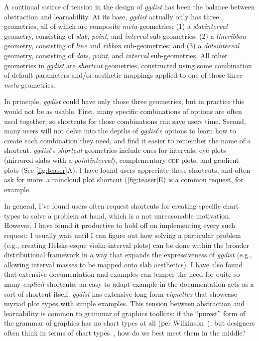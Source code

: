 \documentclass[journal]{vgtc}              %
\begin{document}
A continual source of tension in the design of \textit{ggdist} has been the balance between abstraction and learnability. At its base, \textit{ggdist} actually only has three geometries, all of which are composite \textit{meta}-geometries: (1) a \textit{slabinterval} geometry, consisting of \textit{slab}, \textit{point}, and \textit{interval} sub-geometries; (2) a \textit{lineribbon} geometry, consisting of \textit{line} and \textit{ribbon} sub-geometries; and (3) a \textit{dotsinterval} geometry, consisting of \textit{dots}, \textit{point}, and \textit{interval} sub-geometries. All other geometries in \textit{ggdist} are \textit{shortcut} geometries, constructed using some combination of default parameters and/or aesthetic mappings applied to one of those three \textit{meta}-geometries.

In principle, \textit{ggdist} could have only those three geometries, but in practice this would not be as usable. First, many specific combinations of options are often used together, so shortcuts for those combinations can save users time. Second, many users will not delve into the depths of \textit{ggdist}'s options to learn how to create each combination they need, and find it easier to remember the name of a shortcut. \textit{ggdist}'s \textit{shortcut} geometries include ones for intervals, eye plots (mirrored slabs with a \textit{pointinterval}), complementary \textsc{cdf} plots, and gradient plots (See \cref{fig:teaser}A). I have found users appreciate these shortcuts, and often ask for more: a raincloud plot shortcut (\cref{fig:teaser}E) is a common request, for example.

In general, I've found users often request shortcuts for creating specific chart types to solve a problem at hand, which is a not unreasonable motivation. However, I have found it productive to hold off on implementing every such request: I usually wait until I can figure out how solving a particular problem (e.g., creating Helske-esque violin-interval plots) can be done within the broader distributional framework in a way that expands the expressiveness of \textit{ggdist} (e.g., allowing interval masses to be mapped onto slab aesthetics). I have also found that extensive documentation and examples can temper the need for quite so many \textit{explicit} shortcuts; an easy-to-adapt example in the documentation acts as a sort of shortcut itself. \textit{ggdist} has extensive long-form \textit{vignettes} that showcase myriad plot types with simple examples. This tension between abstraction and learnability is common to grammar of graphics toolkits: if the ``purest'' form of the grammar of graphics has no chart types at all (per Wilkinson~\cite{wilkinson2012grammar}), but designers often think in terms of chart types~\cite{pu2023inpractice}, how do we best meet them in the middle?
\end{document}
